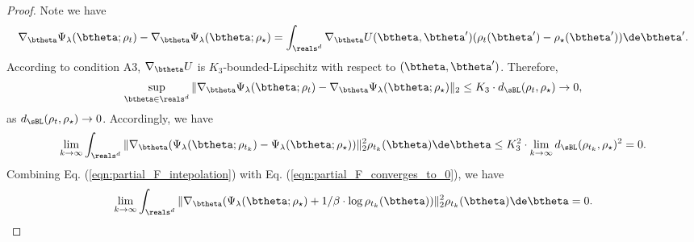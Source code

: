 \documentclass[11pt]{article}
\begin{document}
\begin{proof}
Note we have 
\[
\nabla_\btheta\Psi_\lambda(\btheta; \rho_t) - \nabla_\btheta\Psi_\lambda(\btheta; \rho_\star) = \int_{\reals^d} \nabla_\btheta U(\btheta, \btheta') (\rho_t(\btheta') - \rho_\star(\btheta')) \de \btheta'. 
\]
According to condition {\sf A3}, $\nabla_\btheta U$ is $K_3$-bounded-Lipschitz with respect to $(\btheta, \btheta')$. Therefore, 
\begin{align}
\sup_{\btheta \in \reals^d} \| \nabla_\btheta \Psi_\lambda(\btheta; \rho_t) - \nabla_\btheta \Psi_\lambda(\btheta; \rho_\star)\|_2 \le K_3 \cdot d_{\sBL}(\rho_{t}, \rho_\star) \to 0,
\end{align}
as $d_{\sBL}(\rho_{t}, \rho_\star) \to 0$. Accordingly, we have  
\begin{align}\label{eqn:partial_F_intepolation}
\lim_{k \to \infty} \int_{\reals^d} \| \nabla_\btheta(\Psi_\lambda(\btheta; \rho_{t_k}) - \Psi_\lambda(\btheta; \rho_\star) )\|_2^2 \rho_{t_k}(\btheta) \de \btheta \le K_3^2 \cdot \lim_{k \to \infty} d_{\sBL}(\rho_{t_k}, \rho_\star)^2 = 0.
\end{align}
Combining Eq. (\ref{eqn:partial_F_intepolation}) with Eq. (\ref{eqn:partial_F_converges_to_0}), we have 
\begin{align}\label{eqn:partial_F_converges_to_0_intepolation}
\lim_{k \to \infty} \int_{\reals^d} \| \nabla_\btheta(\Psi_\lambda(\btheta; \rho_\star) + 1/\beta \cdot \log \rho_{t_k}(\btheta)) \|_2^2 \rho_{t_k}(\btheta) \de \btheta = 0.
\end{align}


\end{proof}
\end{document}
